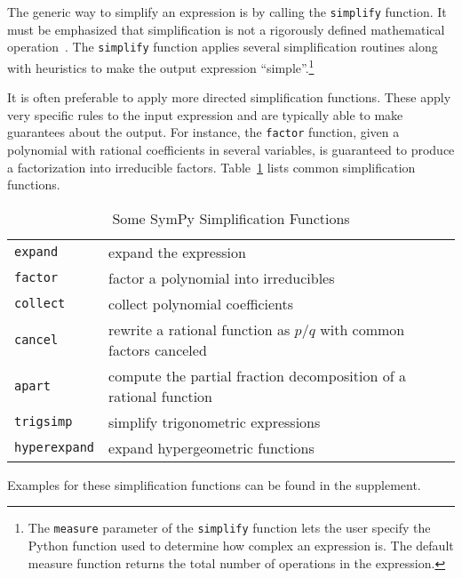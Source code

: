 



The generic way to simplify an expression is by calling the \texttt{simplify}
function.
It must be emphasized that simplification is not a rigorously defined
mathematical operation~\cite{Moses1971simplification}.
The \texttt{simplify} function applies several simplification routines along
with heuristics to make the output expression ``simple''.\footnote{The
\texttt{measure} parameter of the \texttt{simplify}
function lets the user specify the Python function used to determine how complex an
expression is.  The default measure function returns the total number of
operations in the expression.}

It is often preferable to apply more directed simplification functions. These
apply very specific rules to the input expression and are typically able to make
guarantees about the output. For instance, the \texttt{factor} function,
given a polynomial with rational coefficients in several variables,
is guaranteed to
produce a factorization into irreducible factors. Table~\ref{simplify-table}
lists common simplification functions.

\begin{center}
\begin{table}[htb]
\caption{Some SymPy Simplification Functions}\label{simplify-table}
\begin{tabular}{ll}
\toprule
\verb|expand| & expand the expression \\
\verb|factor| & factor a polynomial into irreducibles \\
\verb|collect| & collect polynomial coefficients \\
\verb|cancel| & rewrite a rational function as $p/q$ with common factors
canceled \\
\verb|apart| & compute the partial fraction decomposition of a rational function
\\
\verb|trigsimp| & simplify trigonometric expressions~\cite{fu2006automated} \\
\verb|hyperexpand| & expand hypergeometric functions~\cite{Roach1996hyper,roach1997meijerg} \\
\bottomrule
\end{tabular}
\end{table}
\end{center}

Examples for these simplification functions can be found in the supplement.
